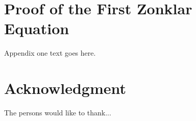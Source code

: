 \documentclass[journal,comsoc]{IEEEtran}
\begin{document}
\appendices
\section{Proof of the First Zonklar Equation}
Appendix one text goes here.


\section*{Acknowledgment}


The persons would like to thank...


\ifCLASSOPTIONcaptionsoff
  \newpage
\fi





%
%
%



%

\end{document}
